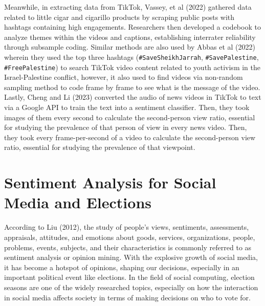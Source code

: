 Meanwhile, in extracting data from TikTok, Vassey, et al (2022) gathered data related to little cigar and cigarillo products by scraping public posts with hashtags containing high engagements.\cite{RRL_Vassey-2022} Researchers then developed a codebook to analyze themes within the videos and captions, establishing interrater reliability through subsample coding. Similar methods are also used by Abbas et al (2022) wherein they used the top three hashtags (\texttt{\#SaveSheikhJarrah}, \texttt{\#SavePalestine}, \texttt{\#FreePalestine}) to search TikTok video content related to youth activism in the Israel-Palestine conflict, however, it also used to find videos via non-random sampling method to code frame by frame to see what is the message of the video.\cite{RRL_Abbas-2022} Lastly, Cheng and Li (2023) converted the audio of news videos in TikTok to text via a Google API to train the text into a sentiment classifier.\cite{RRL_Cheng-2024} Then, they took images of them every second to calculate the second-person view ratio, essential for studying the prevalence of that person of view in every news video. Then, they took every frame-per-second of a video to calculate the second-person view ratio, essential for studying the prevalence of that viewpoint.

\section{Sentiment Analysis for Social Media and Elections}
According to Liu (2012), the study of people's views, sentiments, assessments, appraisals, attitudes, and emotions about goods, services, organizations, people, problems, events, subjects, and their characteristics is commonly referred to as sentiment analysis or opinion mining.\cite{RRL_Liu-2012} With the explosive growth of social media, it has become a hotspot of opinions, shaping our decisions, especially in an important political event like elections. In the field of social computing, election seasons are one of the widely researched topics, especially on how the interaction in social media affects society in terms of making decisions on who to vote for. 

